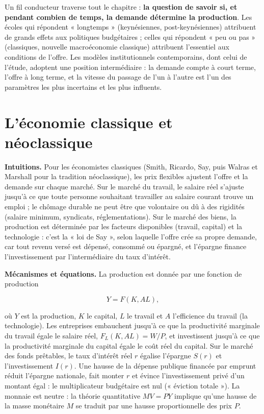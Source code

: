 \documentclass[
  11pt,
  11pt,
  a4paper,
  openany]{book}
\begin{document}
Un fil conducteur traverse tout le chapitre : \textbf{la question de
savoir si, et pendant combien de temps, la demande détermine la
production}. Les écoles qui répondent « longtemps » (keynésiennes,
post-keynésiennes) attribuent de grands effets aux politiques
budgétaires ; celles qui répondent « peu ou pas » (classiques, nouvelle
macroéconomie classique) attribuent l'essentiel aux conditions de
l'offre. Les modèles institutionnels contemporains, dont celui de
l'étude, adoptent une position intermédiaire : la demande compte à court
terme, l'offre à long terme, et la vitesse du passage de l'un à l'autre
est l'un des paramètres les plus incertains et les plus influents.

\hypertarget{sec:classique}{%
\section{L'économie classique et néoclassique}\label{sec:classique}}

\textbf{Intuitions.} Pour les économistes classiques (Smith, Ricardo,
Say, puis Walras et Marshall pour la tradition néoclassique), les prix
flexibles ajustent l'offre et la demande sur chaque marché. Sur le
marché du travail, le salaire réel s'ajuste jusqu'à ce que toute
personne souhaitant travailler au salaire courant trouve un emploi ; le
chômage durable ne peut être que volontaire ou dû à des rigidités
(salaire minimum, syndicats, réglementations). Sur le marché des biens,
la production est déterminée par les facteurs disponibles (travail,
capital) et la technologie : c'est la « loi de Say », selon laquelle
l'offre crée sa propre demande, car tout revenu versé est dépensé,
consommé ou épargné, et l'épargne finance l'investissement par
l'intermédiaire du taux d'intérêt.

\textbf{Mécanismes et équations.} La production est donnée par une
fonction de production

\[Y = F(K, AL),\]

où \(Y\) est la production, \(K\) le capital, \(L\) le travail et \(A\)
l'efficience du travail (la technologie). Les entreprises embauchent
jusqu'à ce que la productivité marginale du travail égale le salaire
réel, \(F_L(K, AL) = W/P\), et investissent jusqu'à ce que la
productivité marginale du capital égale le coût réel du capital. Sur le
marché des fonds prêtables, le taux d'intérêt réel \(r\) égalise
l'épargne \(S(r)\) et l'investissement \(I(r)\). Une hausse de la
dépense publique financée par emprunt réduit l'épargne nationale, fait
monter \(r\) et évince l'investissement privé d'un montant égal : le
multiplicateur budgétaire est nul (« éviction totale »). La monnaie est
neutre : la théorie quantitative \(MV = PY\) implique qu'une hausse de
la masse monétaire \(M\) se traduit par une hausse proportionnelle des
prix \(P\).
\end{document}
